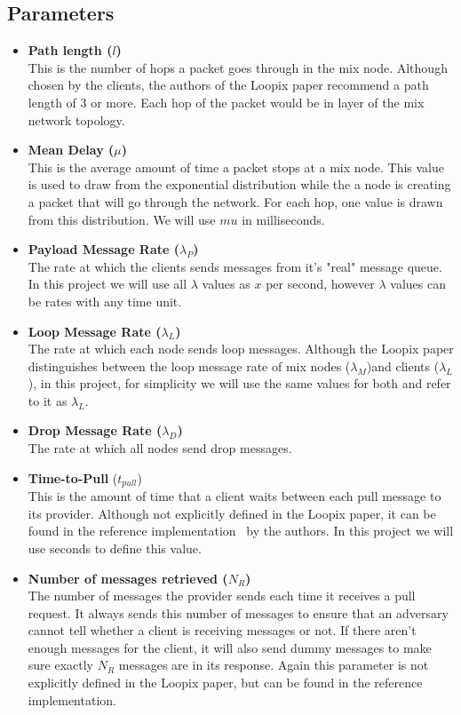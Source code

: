 \documentclass[a4paper,11pt,oneside]{report}
\begin{document}
\subsection{Parameters}
\label{sec:loopix_parameters}

\begin{itemize}
\item \textbf{Path length (\(l\))} \\
This is the number of hops a packet goes through in the mix node. Although chosen by the clients, the authors of the Loopix paper recommend a path length of 3 or more. Each hop of the packet would be in layer of the mix network topology.
\item \textbf{Mean Delay (\(\mu\))} \\
This is the average amount of time a packet stops at a mix node. This value is used to draw from the exponential distribution while the a node is creating a packet that will go through the network. For each hop, one value is drawn from this distribution. We will use \(mu\) in milliseconds.
\item \textbf{Payload Message Rate (\(\lambda_P\))} \\
The rate at which the clients sends messages from it's "real" message queue. In this project we will use all \(\lambda\) values as \(x\) per second, however \(\lambda\) values can be rates with any time unit.
\item \textbf{Loop Message Rate (\(\lambda_L\))} \\ 
The rate at which each node sends loop messages. Although the Loopix paper distinguishes between the loop message rate of mix nodes (\(\lambda_M\))and clients (\(\lambda_L\)), in this project, for simplicity we will use the same values for both and refer to it as \(\lambda_L\).
\item \textbf{Drop Message Rate  (\(\lambda_D\))} \\
The rate at which all nodes send drop messages. 
\item \textbf{Time-to-Pull} (\(t_{pull}\))\\
This is the amount of time that a client waits between each pull message to its provider. Although not explicitly defined in the Loopix paper, it can be found in the reference implementation~\cite{impl_loopix} by the authors. In this project we will use seconds to define this value.
\item \textbf{Number of messages retrieved (\(N_R\))} \\
The number of messages the provider sends each time it receives a pull request. It always sends this number of messages to ensure that an adversary cannot tell whether a client is receiving messages or not. If there aren't enough messages for the client, it will also send dummy messages to make sure exactly \(N_R\) messages are in its response. Again this parameter is not explicitly defined in the Loopix paper, but can be found in the reference implementation.


\end{itemize}
\end{document}

